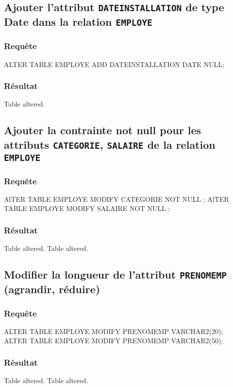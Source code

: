 \documentclass[•]{article}
\begin{document}
\subsection{Ajouter l’attribut \texttt{DATEINSTALLATION} de type Date dans la relation \texttt{EMPLOYE}}
\subsubsection{Requête}
\begin{sql}
ALTER TABLE EMPLOYE ADD DATEINSTALLATION DATE NULL;
\end{sql}
\subsubsection{Résultat}
\begin{sql}
Table altered.
\end{sql}
\subsection{Ajouter la contrainte not null pour les attributs \texttt{CATEGORIE}, \texttt{SALAIRE} de la relation \texttt{EMPLOYE}}
\subsubsection{Requête}
\begin{sql}
AlTER TABLE EMPLOYE MODIFY CATEGORIE NOT NULL ;
AlTER TABLE EMPLOYE MODIFY SALAIRE NOT NULL ;
\end{sql}
\subsubsection{Résultat}
\begin{sql}
Table altered.
Table altered.
\end{sql}
\subsection{Modifier la longueur de l’attribut \texttt{PRENOMEMP} (agrandir, réduire)}
\subsubsection{Requête}
\begin{sql}
ALTER TABLE EMPLOYE MODIFY PRENOMEMP VARCHAR2(20);
ALTER TABLE EMPLOYE MODIFY PRENOMEMP VARCHAR2(50);
\end{sql}
\subsubsection{Résultat}
\begin{sql}
Table altered.
Table altered.
\end{sql}
\end{document}
